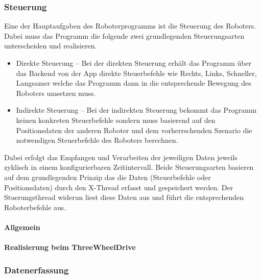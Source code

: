 \subsubsection{Steuerung}
Eine der Hauptaufgaben des Roboterprogramms ist die Steuerung des Roboters. Dabei muss das Programm die folgende zwei 
grundlegenden Steuerungsarten unterscheiden und realisieren.
\begin{itemize}
	\item{Direkte Steuerung} -- Bei der direkten Steuerung erhält das Programm über das Backend von der App direkte Steuerbefehle wie
	Rechts, Links, Schneller, Langsamer welche das Programm dann in die entsprechende Bewegung des Roboters umsetzen muss.
	\item{Indirekte Steuerung} -- Bei der indirekten Steuerung bekommt das Programm keinen konkreten Steuerbefehle sondern muss basierend
	auf den Positionsdaten der anderen Roboter und dem vorherrschenden Szenario die notwendigen Steuerbefehle des Roboters berechnen.
\end{itemize}
Dabei erfolgt das Empfangen und Verarbeiten der jeweiligen Daten jeweils zyklisch in einem konfigurierbaren Zeitintervall. Beide Steuerungsarten
basieren auf dem grundlegenden Prinzip das die Daten (Steuerbefehle oder Positionsdaten) durch den X-Thread erfasst und gespeichert werden.
Der Stuerungsthread widerun liest diese Daten aus und führt die entsprechenden Roboterbefehle aus.
\paragraph{Allgemein}
\paragraph{Realisierung beim ThreeWheelDrive}
\subsubsection{Datenerfassung}

